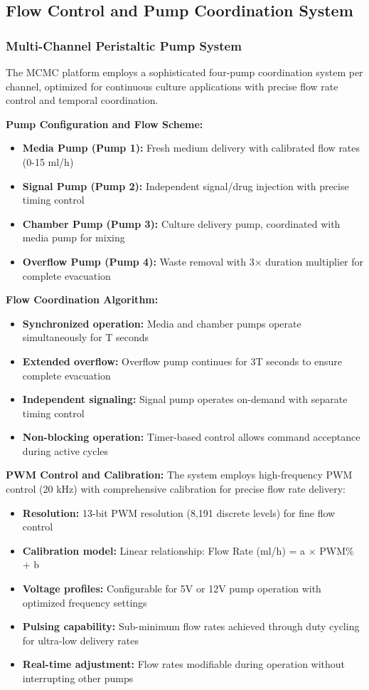 \subsection{Flow Control and Pump Coordination System}

\subsubsection{Multi-Channel Peristaltic Pump System}

The MCMC platform employs a sophisticated four-pump coordination system per channel, optimized for continuous culture applications with precise flow rate control and temporal coordination.

\textbf{Pump Configuration and Flow Scheme:}
\begin{itemize}
\item \textbf{Media Pump (Pump 1):} Fresh medium delivery with calibrated flow rates (0-15 ml/h)
\item \textbf{Signal Pump (Pump 2):} Independent signal/drug injection with precise timing control
\item \textbf{Chamber Pump (Pump 3):} Culture delivery pump, coordinated with media pump for mixing
\item \textbf{Overflow Pump (Pump 4):} Waste removal with 3× duration multiplier for complete evacuation
\end{itemize}

\textbf{Flow Coordination Algorithm:}
\begin{itemize}
\item \textbf{Synchronized operation:} Media and chamber pumps operate simultaneously for T seconds
\item \textbf{Extended overflow:} Overflow pump continues for 3T seconds to ensure complete evacuation
\item \textbf{Independent signaling:} Signal pump operates on-demand with separate timing control
\item \textbf{Non-blocking operation:} Timer-based control allows command acceptance during active cycles
\end{itemize}

\textbf{PWM Control and Calibration:}
The system employs high-frequency PWM control (20 kHz) with comprehensive calibration for precise flow rate delivery:

\begin{itemize}
\item \textbf{Resolution:} 13-bit PWM resolution (8,191 discrete levels) for fine flow control
\item \textbf{Calibration model:} Linear relationship: Flow Rate (ml/h) = a × PWM\% + b
\item \textbf{Voltage profiles:} Configurable for 5V or 12V pump operation with optimized frequency settings
\item \textbf{Pulsing capability:} Sub-minimum flow rates achieved through duty cycling for ultra-low delivery rates
\item \textbf{Real-time adjustment:} Flow rates modifiable during operation without interrupting other pumps
\end{itemize}

